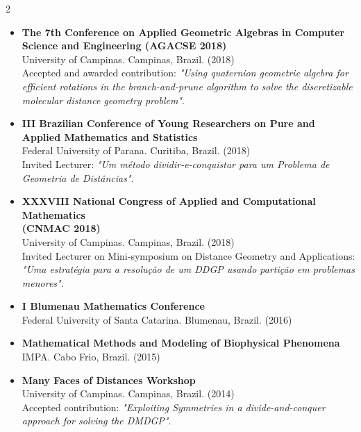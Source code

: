 \documentclass[10pt,A4,english]{article}
\begin{document}
\begin{paracol}{2}
\begin{rightcolumn}
\begin{itemize}[leftmargin=*]
\bigskip 

\item \textbf{The 7th Conference on Applied Geometric Algebras in Computer Science and Engineering (AGACSE 2018)} 
\medskip \\
University of Campinas. Campinas, Brazil. (2018)
\medskip \\
Accepted and awarded contribution: \textit{"Using quaternion geometric algebra for efficient rotations in the branch-and-prune algorithm to solve the discretizable molecular distance geometry problem"}.

\bigskip

\item \textbf{III Brazilian Conference of Young Researchers on Pure and Applied Mathematics and Statistics}
\medskip \\
Federal University of Parana. Curitiba, Brazil. (2018)
\medskip \\
Invited Lecturer: \textit{"Um método dividir-e-conquistar para um Problema de Geometria de Distâncias"}.

\bigskip

\item \textbf{XXXVIII National Congress of Applied and Computational Mathematics \\ (CNMAC 2018)}
\medskip \\
University of Campinas. Campinas, Brazil. (2018)
\medskip \\
Invited Lecturer on Mini-symposium on Distance Geometry and Applications: \textit{"Uma estratégia para a resolução de um DDGP usando partição em problemas menores"}.

\bigskip

\item \textbf{I Blumenau Mathematics Conference} 
\medskip \\
Federal University of Santa Catarina. Blumenau, Brazil. (2016)

\bigskip

\item \textbf{Mathematical Methods and Modeling of Biophysical Phenomena} 
\medskip \\
IMPA. Cabo Frio, Brazil. (2015)

\bigskip

\item \textbf{Many Faces of Distances Workshop}
\medskip \\
University of Campinas. Campinas, Brazil. (2014)
\medskip \\
Accepted contribution: \textit{"Exploiting Symmetries in a divide-and-conquer approach for solving the DMDGP"}.


\end{itemize}
\end{rightcolumn}
\end{paracol}
\end{document}
